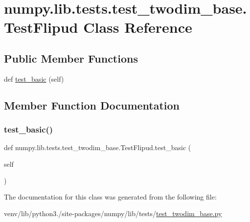 \hypertarget{classnumpy_1_1lib_1_1tests_1_1test__twodim__base_1_1TestFlipud}{}\section{numpy.\+lib.\+tests.\+test\+\_\+twodim\+\_\+base.\+Test\+Flipud Class Reference}
\label{classnumpy_1_1lib_1_1tests_1_1test__twodim__base_1_1TestFlipud}
\subsection*{Public Member Functions}
\begin{DoxyCompactItemize}
\item 
def \hyperlink{classnumpy_1_1lib_1_1tests_1_1test__twodim__base_1_1TestFlipud_ab88ee7216fb38e044c98155efa43d79d}{test\+\_\+basic} (self)
\end{DoxyCompactItemize}


\subsection{Member Function Documentation}
\mbox{\label{classnumpy_1_1lib_1_1tests_1_1test__twodim__base_1_1TestFlipud_ab88ee7216fb38e044c98155efa43d79d}} 
\subsubsection{\texorpdfstring{test\+\_\+basic()}{test\_basic()}}
{\footnotesize\ttfamily def numpy.\+lib.\+tests.\+test\+\_\+twodim\+\_\+base.\+Test\+Flipud.\+test\+\_\+basic (\begin{DoxyParamCaption}\item[{}]{self }\end{DoxyParamCaption})}



The documentation for this class was generated from the following file\+:\begin{DoxyCompactItemize}
\item 
venv/lib/python3./site-\/packages/numpy/lib/tests/\hyperlink{test__twodim__base_8py}{test\+\_\+twodim\+\_\+base.\+py}\end{DoxyCompactItemize}
